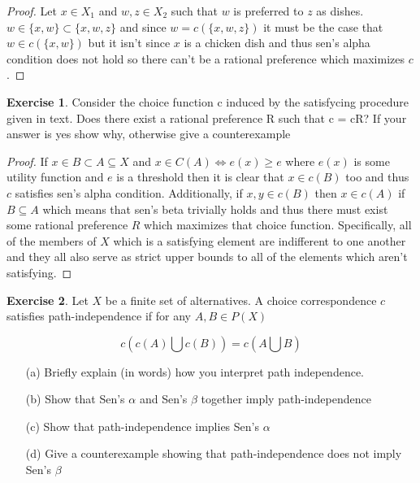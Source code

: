 \documentclass[11pt,oneside]{article}
\numberwithin{equation}{section}
\theoremstyle{definition}
\newtheorem{exercise}{Exercise}
\newcommand{\IFF}{\Longleftrightarrow}
\newcommand{\union}{\bigcup}
\begin{document}
\begin{proof}

Let $x \in X_1$ and $w,z \in X_2$ such that $w$ is preferred to $z$ as dishes. $w \in \{x,w\} \subset \{x,w,z\}$ and since $w = c(\{x,w,z\})$ it must be the case that $w \in c(\{x,w\})$ but it isn't since $x$ is a chicken dish and thus sen's alpha condition does not hold so there can't be a rational preference which maximizes $c$. 



\end{proof}


\begin{exercise}

Consider the choice function c induced by the satisfycing procedure given in text. Does there exist a rational preference R such that c = cR? If your answer is yes show why, otherwise give a counterexample


\end{exercise}

\begin{proof}

If $x \in B \subset A \subseteq X$ and $x \in C(A) \IFF e(x) \geq e$ where $e(x)$ is some utility function and $e$ is a threshold then it is clear that $x \in c(B)$ too and thus $c$ satisfies sen's alpha condition.  Additionally, if $x,y \in c(B)$ then $x \in c(A)$ if $B \subseteq A$ which means that sen's beta trivially holds and thus there must exist some rational preference $R$ which maximizes that choice function. Specifically, all of the members of $X$ which is a satisfying element are indifferent to one another and they all also serve as strict upper bounds to all of the elements which aren't satisfying. 
\end{proof}

\begin{exercise}
Let $X$ be a finite set of alternatives. A choice correspondence $c$ satisfies path-independence if for any $A, B \in P(X)$

\[c(c(A) \union c(B)) = c(A \union B)\]

\begin{itemize}

\item[(a)] Briefly explain (in words) how you interpret path independence.

\item[(b)] Show that Sen’s $\alpha$ and Sen’s $\beta$ together imply path-independence

\item[(c)] Show that path-independence implies Sen’s $\alpha$

\item[(d)] Give a counterexample showing that path-independence does not imply Sen’s $\beta$

\end{itemize}

\end{exercise}
\end{document}
